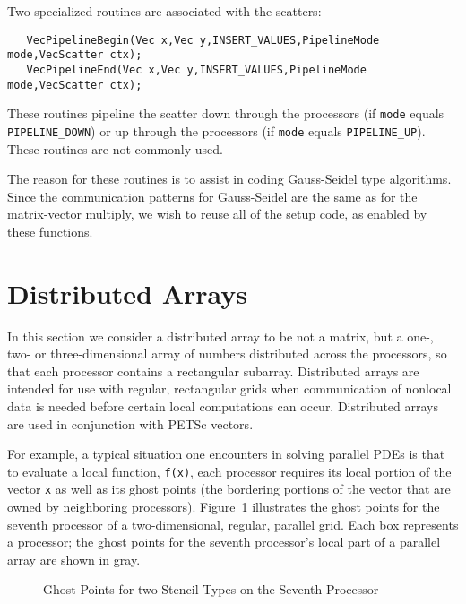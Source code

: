 Two specialized routines  
are associated with the scatters: 
\begin{verbatim}
   VecPipelineBegin(Vec x,Vec y,INSERT_VALUES,PipelineMode mode,VecScatter ctx);
   VecPipelineEnd(Vec x,Vec y,INSERT_VALUES,PipelineMode mode,VecScatter ctx);
\end{verbatim}
These routines pipeline the scatter down through the processors (if 
{\tt mode} equals {\tt PIPELINE\_DOWN}) or up through the processors 
(if {\tt mode} equals {\tt PIPELINE\_UP}).
These routines are not commonly used.

\begin{design}
The reason for these routines is to assist in coding Gauss-Seidel type 
algorithms. Since the communication patterns for 
Gauss-Seidel are the same as for the matrix-vector multiply, we wish
to reuse all of the setup code, as enabled by these functions.
\end{design}


\section{Distributed Arrays}

In this section we consider a distributed array to be not a matrix,
but a one-, two- or three-dimensional array of numbers distributed
across the processors, so that each processor contains a rectangular
subarray.  Distributed arrays are intended for use with regular,
rectangular grids when communication of nonlocal data is needed before
certain local computations can occur.  Distributed arrays are used in
conjunction with PETSc vectors.

For example, a typical situation one encounters in solving parallel
PDEs is that to evaluate a local function, {\tt f(x)}, each processor
requires its local portion of the vector {\tt x} as well as its ghost
points  (the bordering portions of the vector
that are owned by neighboring processors).  Figure~\ref{fig:ghosts}
illustrates the ghost points for the seventh processor of a
two-dimensional, regular, parallel grid.  Each box represents a
processor; the ghost points for the seventh processor's local part of
a parallel array are shown in gray.

\begin{figure}[tb]
\centerline{}
\caption{Ghost Points for two Stencil Types on the Seventh Processor}
\label{fig:ghosts}
\end{figure}

